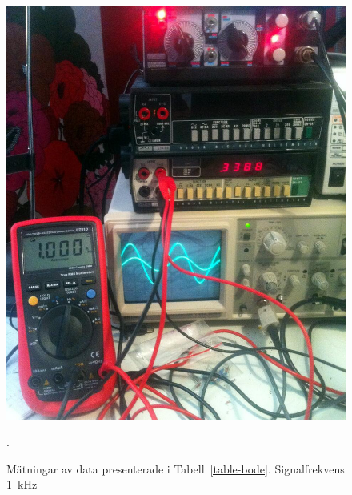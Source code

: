\begin{figure}\label{fig:bode-foto-1000}
  \centering
  \includegraphics[width=\linewidth]{img/bode_1000Hz.jpg}
  \caption[] {Mätningar av data presenterade i Tabell~\ref{table-bode}.
              Signalfrekvens \SI{1}{\kHz}}.
\end{figure}

